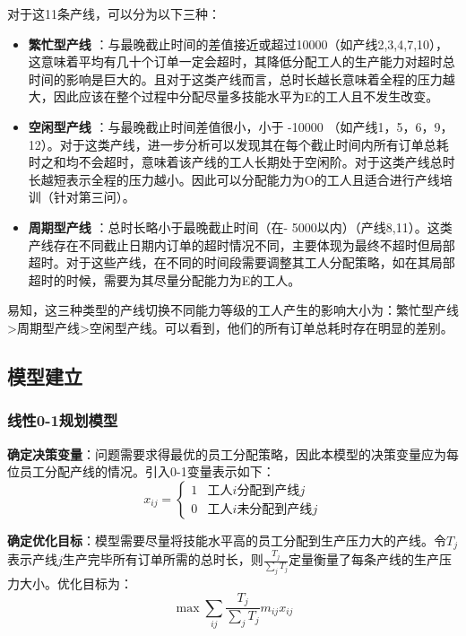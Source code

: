 对于这11条产线，可以分为以下三种：
\begin{itemize}[left=1em]
    \item \textbf{繁忙型产线} ：与最晚截止时间的差值接近或超过10000（如产线2,3,4,7,10），这意味着平均有几十个订单一定会超时，其降低分配工人的生产能力对超时总时间的影响是巨大的。且对于这类产线而言，总时长越长意味着全程的压力越大，因此应该在整个过程中分配尽量多技能水平为E的工人且不发生改变。
    \item \textbf{空闲型产线} ：与最晚截止时间差值很小，小于 -10000 （如产线1，5，6，9，12）。对于这类产线，进一步分析可以发现其在每个截止时间内所有订单总耗时之和均不会超时，意味着该产线的工人长期处于空闲阶。对于这类产线总时长越短表示全程的压力越小。因此可以分配能力为O的工人且适合进行产线培训（针对第三问）。
    \item \textbf{周期型产线} ：总时长略小于最晚截止时间（在- 5000以内）（产线8,11）。这类产线存在不同截止日期内订单的超时情况不同，主要体现为最终不超时但局部超时。对于这些产线，在不同的时间段需要调整其工人分配策略，如在其局部超时的时候，需要为其尽量分配能力为E的工人。
\end{itemize}


易知，这三种类型的产线切换不同能力等级的工人产生的影响大小为：繁忙型产线>周期型产线>空闲型产线。可以看到，他们的所有订单总耗时存在明显的差别。


\subsection{模型建立}
\subsubsection{线性0-1规划模型}
\textbf{确定决策变量}：问题需要求得最优的员工分配策略，因此本模型的决策变量应为每位员工分配产线的情况。引入0-1变量表示如下：
\begin{equation}
    \label{eq:01}
    x_{ij}=
    \begin{cases}
        1 & \text{工人}i\text{分配到产线}j \\
        0 & \text{工人}i\text{未分配到产线}j
    \end{cases}
\end{equation}

\textbf{确定优化目标}：模型需要尽量将技能水平高的员工分配到生产压力大的产线。令$T_j$表示产线$j$生产完毕所有订单所需的总时长，则$\frac{T_j}{\sum_j T_j}$定量衡量了每条产线的生产压力大小。优化目标为：
\begin{equation}
    \label{eq:goal}
    \max \sum_{ij} \frac{T_j}{\sum_j T_j} m_{ij}x_{ij}
\end{equation}


